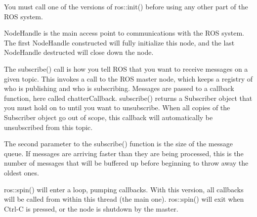 You must call one of the versions of ros\-::init() before using any other part of the R\-O\-S system.

Node\-Handle is the main access point to communications with the R\-O\-S system. The first Node\-Handle constructed will fully initialize this node, and the last Node\-Handle destructed will close down the node.

The subscribe() call is how you tell R\-O\-S that you want to receive messages on a given topic. This invokes a call to the R\-O\-S master node, which keeps a registry of who is publishing and who is subscribing. Messages are passed to a callback function, here called chatter\-Callback. subscribe() returns a Subscriber object that you must hold on to until you want to unsubscribe. When all copies of the Subscriber object go out of scope, this callback will automatically be unsubscribed from this topic.

The second parameter to the subscribe() function is the size of the message queue. If messages are arriving faster than they are being processed, this is the number of messages that will be buffered up before beginning to throw away the oldest ones.

ros\-::spin() will enter a loop, pumping callbacks. With this version, all callbacks will be called from within this thread (the main one). ros\-::spin() will exit when Ctrl-\/\-C is pressed, or the node is shutdown by the master.